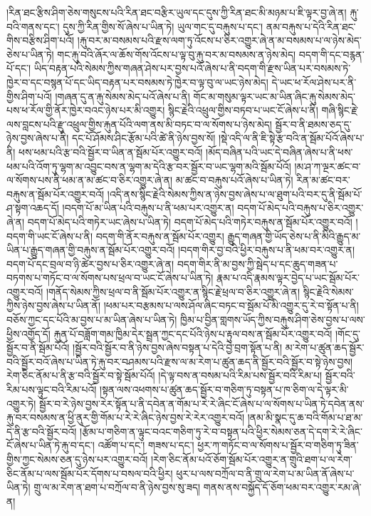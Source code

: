 །རིན་ཐང་རྩིས་ཤིག་ཅེས་གསུངས་པའི་རིན་ཐང་བརྩིར་ཡུལ་དང་དུས་ཀྱི་རིན་ཐང་མི་མཉམ་པ་ཇི་ལྟར་བྱ་ཞེ་ན། རྐུ་བའི་གནས་དང་། དུས་ཀྱི་རིན་གྱིས་སོ་ཞེས་པ་ཡིན་ཏེ། ཡུལ་གང་དུ་བརྐུས་པ་དང་། ནམ་བརྐུས་པ་དེའི་རིན་ཐང་གིས་བརྩིས་ཤིག་པའོ། །རྐུ་བར་མ་བསམས་པའི་རྫས་ལག་ཏུ་འོངས་པ་ཅིར་འགྱུར་ཞེ་ན་མ་བསམས་པ་ལ་ཉེས་མེད་ཅེས་པ་ཡིན་ཏེ། གང་རྐུ་བའི་ཞོར་ལ་ཆོས་གོས་འོངས་པ་ལྟ་བུ་རྐུ་བར་མ་བསམས་ན་ཉེས་མེད། བདག་གི་དང་བརྙན་པོ་དང་། ཡིད་བརྟན་པའི་སེམས་ཀྱིས་གཞན་ཤེས་པར་བྱས་པའོ་ཞེས་པ་ནི་བདག་གི་རྫས་ཡིན་པར་བསམས་ཏེ་ཁྱེར་བ་དང་བསྙན་པོ་དང་ཡིད་བརྟན་པར་བསམས་ཏེ་ཁྱེར་བ་ལྟ་བུ་ལ་ཡང་ཉེས་མེད། དེ་ཡང་ཕ་རོལ་ཤེས་པར་ནི་གྱིས་ཤིག་པའོ། །གཞན་དུ་ན་རྐུ་སེམས་མེད་པའོ་ཞེས་པ་ནི། གོང་མ་གསུམ་ལྟར་ཡང་མ་ཡིན་ཞིང་རྐུ་སེམས་མེད་པས་ཕ་རོལ་གྱི་ནོར་ཁྱེར་བའང་ཉེས་པར་མི་འགྱུར། སྙིང་རྗེའི་འཕྲུལ་གྱིས་བཏབ་པ་ཡང་ངོ་ཞེས་པ་ནི། གཞི་སྙིང་རྗེ་ལས་བླངས་པའི་རྫུ་འཕྲུལ་གྱིས་རྐུན་པོའི་ལག་ནས་མི་བཏང་བ་ལ་སོགས་པ་ཉེས་མེད། སྦྱོར་བ་ནི་ཐམས་ཅད་དུ་ཉེས་བྱས་ཞེས་པ་ནི། དང་པོ་ཤོམས་ཤིང་རྩོམ་པའི་ཚེ་ནི་ཉེས་བྱས་སོ། །སྡེ་འདི་ལ་ནི་ཇི་སྟེ་རྩ་བའི་ན་སྦོམ་པོའོ་ཞེས་པ་ནི། ཕས་ཕམ་པའི་རྩ་བའི་སྦྱོར་བ་ཡིན་ན་སྦོམ་པོར་འགྱུར་བའོ། །མོད་བཞིན་པའི་ཡང་དེ་བཞིན་ཞེས་པ་ནི་ཕས་ཕམ་པའི་འོག་ཏུ་ལྷག་མ་འབྱུང་བས་ན་ལྷག་མ་དེའི་རྩ་བར་སྦྱོར་བ་ཡང་ལྷག་མའི་སྦོམ་པོའོ། །མ་ཤ་ཀ་ལྔར་ཚང་བ་ལ་སོགས་པས་ནི་ཕམ་ན་མ་ཚང་བ་ཅིར་འགྱུར་ཞེ་ན། མ་ཚང་བ་བརྐུས་པའོ་ཞེས་པ་ཡིན་ཏེ། རིན་མ་ཚང་བར་བརྐུས་ན་སྦོམ་པོར་འགྱུར་བའོ། །འདི་ནས་སྙིང་རྗེའི་སེམས་ཀྱིས་ན་ཉེས་བྱས་ཞེས་པ་ལ་ཐུག་པའི་བར་དུ་ནི་སྦོམ་པོ་ཤ་སྟག་འཆད་དོ། །བདག་པོ་མ་ཡིན་པའི་བརྐུས་པ་ནི་ཕམ་པར་འགྱུར་ན། བདག་པོ་མེད་པའི་བརྐུས་པ་ཅིར་འགྱུར་ཞེ་ན། བདག་པོ་མེད་པའི་གཏེར་ཡང་ཞེས་པ་ཡིན་ཏེ། བདག་པོ་མེད་པའི་གཏེར་བརྐུས་ན་སྦོམ་པོར་འགྱུར་བའོ། །བདག་གི་ཡང་ངོ་ཞེས་པ་ནི། བདག་གི་ནོར་བརྐུས་ན་སྦོམ་པོར་འགྱུར། རྒྱུད་གཞན་གྱི་ཡོད་ཅེས་པ་ནི་མིའི་རྒྱུད་མ་ཡིན་པ་རྒྱུད་གཞན་གྱི་བརྐུས་ན་སྦོམ་པོར་འགྱུར་བའོ། །བདག་གིར་བྱ་བའི་ཕྱིར་བརྐུས་པ་ནི་ཕམ་བར་འགྱུར་ན། བདག་པོ་དང་བྲལ་བ་ཉི་ཚེར་བྱས་པ་ཅིར་འགྱུར་ཞེ་ན། བདག་གིར་ནི་མ་བྱས་ཀྱི་སྦེད་པ་དང་ཆུད་གཟན་པ་བཏགས་པ་གཏོང་བ་ལ་སོགས་པས་ཕྲལ་བ་ཡང་ངོ་ཞེས་པ་ཡིན་ཏེ། རྣམ་པ་འདི་རྣམས་ལྟར་བྱེད་པ་ཡང་སྦོམ་པོར་འགྱུར་བའོ། །གནོད་སེམས་ཀྱིས་ཕྲལ་བ་ནི་སྦོམ་པོར་འགྱུར་ན་སྙིང་རྗེ་ཕྲལ་བ་ཅིར་འགྱུར་ཞེ་ན། སྙིང་རྗེའི་སེམས་ཀྱིས་ཉེས་བྱས་ཞེས་པ་ཡིན་ནོ། །ཕམ་པར་བརྩམས་པ་ལས་ཤོལ་ཞིང་བཏང་བ་སྦོམ་པོ་མི་འགྱུར་དུ་རེ་བ་སྟོན་པ་ནི། བཅོས་ཀྱང་དང་པོའི་མ་བྱས་པ་མ་ཡིན་ཞེས་པ་ཡིན་ཏེ། ཁྱིམ་པ་བྱིན་གླགས་ཡོད་ཀྱིས་བརྐུས་ཤིག་ཅེས་བྱས་པ་ལས་ཕྱིས་འགྱོད་དོ། རྐུན་པོ་བཟློག་གམ་ཁྱིམ་དེར་སྦྲན་ཀྱང་དང་པོའི་ཉེས་པ་རྟུལ་བས་ན་སྦོམ་པོར་འགྱུར་བའོ། །གོང་དུ་སྦྱོར་བ་ནི་སྦོམ་པོའོ། །སྦྱོར་བའི་སྦྱོར་བ་ནི་ཉེས་བྱས་ཞེས་བསྟན་པ་དེའི་བྱེ་བྲག་སྟོན་པ་ནི། མ་རེག་པ་ཚུན་ཆད་སྦྱོར་བའི་སྦྱོར་བའོ་ཞེས་པ་ཡིན་ཏེ་རྐུ་བར་བཤམས་པའི་རྫས་ལ་མ་རེག་པ་ཚུན་ཆད་ནི་སྦྱོར་བའི་སྦྱོར་བ་སྟེ་ཉེས་བྱས། རེག་ཅིང་ནོམ་པ་ནི་རྩ་བའི་སྦྱོར་བ་སྟེ་སྦོམ་པོའོ། །དེ་ལྟ་བས་ན་བསམ་པའི་རིམ་པས་སྦྱོར་བའི་རིམ་པ། སྦྱོར་བའི་རིམ་པས་ལྟུང་བའི་རིམ་པའོ། །སྟན་ལས་འཕགས་པ་ཚུན་ཆད་སྦྱོར་བ་གཅིག་ཏུ་བསྟན་པ་ཁ་ཅིག་ལ་དེ་ལྟར་མི་འགྱུར་ཏེ། སྦྱོར་བ་རེ་ཉེས་བྱས་རེར་སྟོན་པ་ནི་དབེན་ན་གོམ་པ་རེ་རེ་ཞིང་ངོ་ཞེས་པ་ལ་སོགས་པ་ཡིན་ཏེ་དབེན་ནས་རྐུ་བར་བསམས་ན་ཕྱི་ནུར་གྱི་གོམ་པ་རེ་རེ་ཞིང་ཉེས་བྱས་རེ་རེར་འགྱུར་བའོ། །ནམ་མི་སྣང་དུ་ཆ་བའི་གོམ་པ་ཐ་མ་དེ་ནི་རྩ་བའི་སྦྱོར་བའོ། །རྩོམ་པ་གཅིག་ན་ལྟུང་བའང་གཅིག་ཏུ་རེ་བ་བསྟན་པའི་ཕྱིར་སེམས་ཅན་དེ་དག་རེ་རེ་ཞིང་ངོ་ཞེས་པ་ཡིན་ཏེ་རྐུ་བ་དང་། འཚོག་པ་དང་། གཟས་པ་དང་། ཕྱར་ཀ་གཏོང་བ་ལ་སོགས་པ་སྦྱོར་བ་གཅིག་ཏུ་ཟིན་གྱིས་ཀྱང་སེམས་ཅན་དུ་ཉེས་པར་འགྱུར་བའོ། །རེག་ཅིང་ནོམ་པའོ་ཅོག་སྦོམ་པོར་འགྱུར་ན་གྲུའི་ཐག་པ་ལ་རེག་ཅིང་ནོམ་པ་ལས་སྦོམ་པོར་དོགས་པ་བསལ་བའི་ཕྱིར། ཕུར་པ་ལས་བཀྲོལ་བ་ནི་གྲུ་ལ་རེག་པ་མ་ཡིན་ནོ་ཞེས་པ་ཡིན་ཏེ། གྲུ་ལ་མ་རེག་ན་ཐག་པ་བཀྲོལ་བ་ནི་ཉེས་བྱས་སུ་ཟད། གནས་ནས་བསྐྱོད་དོ་ཅོག་ཕམ་བར་འགྱུར་རམ་ཞེ་ན། 